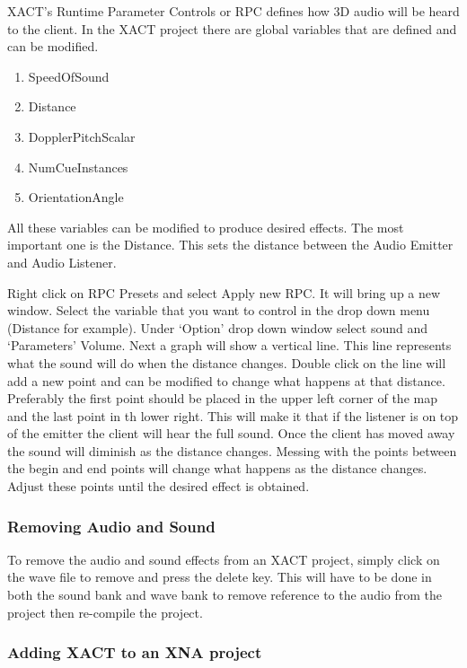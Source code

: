 XACT's Runtime Parameter Controls or RPC defines how 3D audio will be heard to the client. In the XACT project there are global variables that are defined and can be modified.

\begin{enumerate}
\item SpeedOfSound
\item Distance
\item DopplerPitchScalar
\item NumCueInstances
\item OrientationAngle
\end{enumerate}

All these variables can be modified to produce desired effects. The most important one is the Distance. This sets the distance between the Audio Emitter and Audio Listener.

Right click on RPC Presets and select Apply new RPC. It will bring up a new window. Select the variable that you want to control in the drop down menu (Distance for example). Under `Option' drop down window select sound and `Parameters' Volume. Next a graph will show a vertical line. This line represents what the sound will do when the distance changes. Double click on the line will add a new point and can be modified to change what happens at that distance. Preferably the first point should be placed in the upper left corner of the map and the last point in th lower right. This will make it that if the listener is on top of the emitter the client will hear the full sound. Once the client has moved away the sound will diminish as the distance changes. Messing with the points between the begin and end  points will change what happens as the distance changes. Adjust these points until the desired effect is obtained.  

\subsubsection{Removing Audio and Sound}

To remove the audio and sound effects from an XACT project, simply click on the wave file to remove and press the delete key. This will have to be done in both the sound bank and wave bank to remove reference to the audio from the project then re-compile the project.

\subsubsection{Adding XACT to an XNA project}


